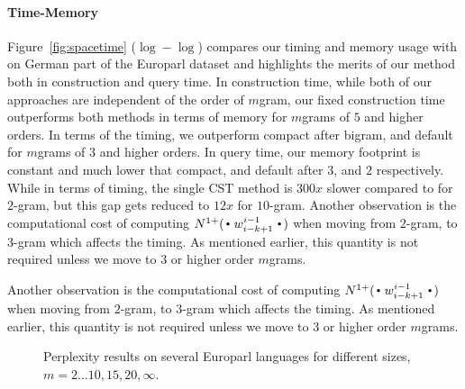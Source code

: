 \paragraph{Time-Memory}
Figure~\ref{fig:spacetime} ($\log-\log$) compares our timing and memory usage with \SRILM on German part of the Europarl dataset and highlights the merits of our method both in construction and query time. In construction time, while both of our approaches are independent of the order of $m$gram, our fixed construction time outperforms both \SRILM methods in terms of memory for $m$grams of $5$ and higher orders. In terms of the timing, we outperform \SRILM compact after bigram, and \SRILM default for $m$grams of $3$ and higher orders. In query time, our memory footprint is constant and much lower that \SRILM compact, and default after $3$, and $2$ respectively. While in terms of timing, the single CST method is $300x$ slower compared to \SRILM for $2$-gram, but this gap gets reduced to $12x$ for $10$-gram.  Another observation is the computational cost of computing $\nlplus{\Bigcdot w_{i-k+1}^{i-1} \Bigcdot}$ when moving from $2$-gram, to $3$-gram which affects the timing. As mentioned earlier, this quantity is not required unless we move to $3$ or higher order $m$grams.

Another observation is the computational cost of computing $\nlplus{\Bigcdot w_{i-k+1}^{i-1} \Bigcdot}$ when moving from $2$-gram, to $3$-gram which affects the timing. As mentioned earlier, this quantity is not required unless we move to $3$ or higher order $m$grams.


\begin{figure}[tb]

\caption{Perplexity results on several Europarl languages for different \ngram sizes, $m=2\ldots10,15,20,\infty$.}
\label{fig:pplx}
\end{figure}

